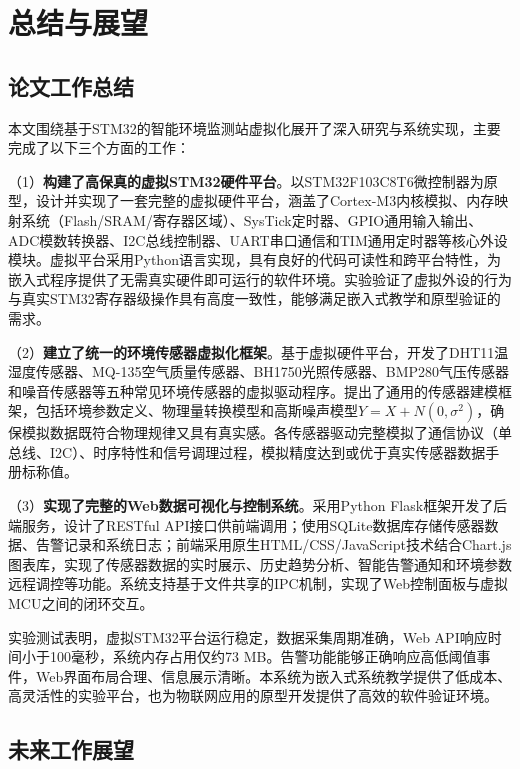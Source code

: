 \documentclass[12pt,a4paper]{ctexart}
\begin{document}
\section{总结与展望}

\subsection{论文工作总结}

本文围绕基于STM32的智能环境监测站虚拟化展开了深入研究与系统实现，主要完成了以下三个方面的工作：

（1）\textbf{构建了高保真的虚拟STM32硬件平台}。以STM32F103C8T6微控制器为原型，设计并实现了一套完整的虚拟硬件平台，涵盖了Cortex-M3内核模拟、内存映射系统（Flash/SRAM/寄存器区域）、SysTick定时器、GPIO通用输入输出、ADC模数转换器、I2C总线控制器、UART串口通信和TIM通用定时器等核心外设模块。虚拟平台采用Python语言实现，具有良好的代码可读性和跨平台特性，为嵌入式程序提供了无需真实硬件即可运行的软件环境。实验验证了虚拟外设的行为与真实STM32寄存器级操作具有高度一致性，能够满足嵌入式教学和原型验证的需求。

（2）\textbf{建立了统一的环境传感器虚拟化框架}。基于虚拟硬件平台，开发了DHT11温湿度传感器、MQ-135空气质量传感器、BH1750光照传感器、BMP280气压传感器和噪音传感器等五种常见环境传感器的虚拟驱动程序。提出了通用的传感器建模框架，包括环境参数定义、物理量转换模型和高斯噪声模型$Y = X + N(0, \sigma^2)$，确保模拟数据既符合物理规律又具有真实感。各传感器驱动完整模拟了通信协议（单总线、I2C）、时序特性和信号调理过程，模拟精度达到或优于真实传感器数据手册标称值。

（3）\textbf{实现了完整的Web数据可视化与控制系统}。采用Python Flask框架开发了后端服务，设计了RESTful API接口供前端调用；使用SQLite数据库存储传感器数据、告警记录和系统日志；前端采用原生HTML/CSS/JavaScript技术结合Chart.js图表库，实现了传感器数据的实时展示、历史趋势分析、智能告警通知和环境参数远程调控等功能。系统支持基于文件共享的IPC机制，实现了Web控制面板与虚拟MCU之间的闭环交互。

实验测试表明，虚拟STM32平台运行稳定，数据采集周期准确，Web API响应时间小于100毫秒，系统内存占用仅约73 MB。告警功能能够正确响应高低阈值事件，Web界面布局合理、信息展示清晰。本系统为嵌入式系统教学提供了低成本、高灵活性的实验平台，也为物联网应用的原型开发提供了高效的软件验证环境。

\subsection{未来工作展望}
\end{document}
